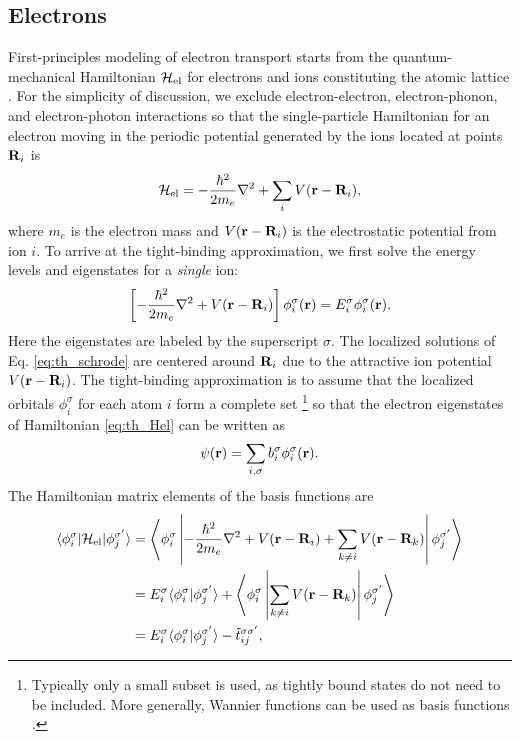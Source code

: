\subsection{Electrons}
\label{sec:th_eom2_electron}

First-principles modeling of electron transport starts from the quantum-mechanical Hamiltonian $\mathcal{H}_{\textrm{el}}$ for electrons and ions constituting the atomic lattice \cite{ashcroftmermin}. For the simplicity of discussion, we exclude electron-electron, electron-phonon, and electron-photon interactions so that the single-particle Hamiltonian for an electron moving in the periodic potential generated by the ions located at points $\mathbf{R}_i$ is \cite{ashcroftmermin}
\begin{equation}
 \mathcal{H}_{\textrm{el}} = - \frac{\hbar^2}{2m_e} \nabla^2  + \sum_i V(\mathbf{r}-\mathbf{R}_i), \label{eq:th_Hel}
\end{equation}
where $m_e$ is the electron mass and $V(\mathbf{r}-\mathbf{R}_i)$ is the electrostatic potential from ion $i$. To arrive at the tight-binding approximation, we first solve the energy levels and eigenstates for a \textit{single} ion:
\begin{equation}
 \left[ - \frac{\hbar^2}{2m_e} \nabla^2  +  V(\mathbf{r}-\mathbf{R}_i) \right] \phi_i^{\sigma} (\mathbf{r}) = E_i^{\sigma} \phi_i^{\sigma}(\mathbf{r}). \label{eq:th_schrode}
\end{equation}
Here the eigenstates are labeled by the superscript $\sigma$. The localized solutions of Eq. \eqref{eq:th_schrode} are centered around $\mathbf{R}_i$ due to the attractive ion potential $V(\mathbf{r}-\mathbf{R}_i)$. The tight-binding approximation is to assume that the localized orbitals $\phi_i^{\sigma}$ for each atom $i$ form a complete set \footnote{Typically only a small subset is used, as tightly bound states do not need to be included. More generally, Wannier functions can be used as basis functions \cite{ashcroftmermin}.} so that the electron eigenstates of Hamiltonian \eqref{eq:th_Hel} can be written as
\begin{equation}
 \psi(\mathbf{r}) = \sum_{i,\sigma} b_i^{\sigma} \phi_{i}^{\sigma}(\mathbf{r}).
\end{equation}
The Hamiltonian matrix elements of the basis functions are
\begin{alignat}{2}
 \langle \phi_i^{\sigma} | \mathcal{H}_{\textrm{el}} | \phi_j^{\sigma'} \rangle &= \left\langle \phi_i^{\sigma} \left| - \frac{\hbar^2}{2m_e} \nabla^2  +V(\mathbf{r}-\mathbf{R}_i)+ \sum_{k\neq i} V(\mathbf{r}-\mathbf{R}_k) \right |\phi_j^{\sigma'} \right\rangle \\
 &= E_i^{\sigma} \langle \phi_i^{\sigma}|\phi_j^{\sigma'} \rangle + \left\langle \phi_i^{\sigma} \left| \sum_{k\neq i} V(\mathbf{r}-\mathbf{R}_k) \right| \phi_j^{\sigma'} \right\rangle \label{eq:th_Helements1} \\
  & = E_i^{\sigma} \langle \phi_i^{\sigma}|\phi_j^{\sigma'} \rangle  - \tilde t_{ij}^{\sigma\sigma'}, \label{eq:th_Helements}
\end{alignat}
